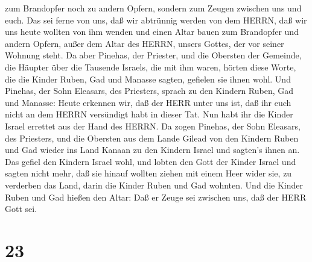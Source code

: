 zum Brandopfer noch zu andern Opfern, sondern zum Zeugen zwischen uns
und euch.  Das sei ferne von uns, daß wir abtrünnig werden
von dem HERRN, daß wir uns heute wollten von ihm wenden und einen Altar
bauen zum Brandopfer und andern Opfern, außer dem Altar des HERRN,
unsers Gottes, der vor seiner Wohnung steht.  Da aber
Pinehas, der Priester, und die Obersten der Gemeinde, die Häupter über
die Tausende Israels, die mit ihm waren, hörten diese Worte, die die
Kinder Ruben, Gad und Manasse sagten, gefielen sie ihnen wohl.
 Und Pinehas, der Sohn Eleasars, des Priesters, sprach zu
den Kindern Ruben, Gad und Manasse: Heute erkennen wir, daß der HERR
unter uns ist, daß ihr euch nicht an dem HERRN versündigt habt in dieser
Tat. Nun habt ihr die Kinder Israel errettet aus der Hand des HERRN.
 Da zogen Pinehas, der Sohn Eleasars, des Priesters, und
die Obersten aus dem Lande Gilead von den Kindern Ruben und Gad wieder
ins Land Kanaan zu den Kindern Israel und sagten's ihnen an.
 Das gefiel den Kindern Israel wohl, und lobten den Gott
der Kinder Israel und sagten nicht mehr, daß sie hinauf wollten ziehen
mit einem Heer wider sie, zu verderben das Land, darin die Kinder Ruben
und Gad wohnten.  Und die Kinder Ruben und Gad hießen den
Altar: Daß er Zeuge sei zwischen uns, daß der HERR Gott sei.

\hypertarget{section-22}{%
\section{23}\label{section-22}}

